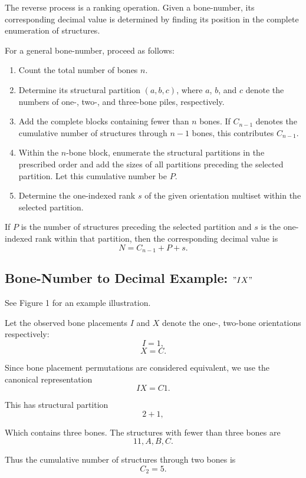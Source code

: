 \documentclass[11pt]{article}
\theoremstyle{remark}
\begin{document}
The reverse process is a ranking operation. Given a bone-number, its corresponding decimal value is determined by finding its position in the complete enumeration of structures.

\bigskip
For a general bone-number, proceed as follows:
\begin{enumerate}
	\item Count the total number of bones \(n\).
	\item Determine its structural partition \((a,b,c)\), where \(a\), \(b\),
	      and \(c\) denote the numbers of one-, two-, and three-bone piles,
	      respectively.
	\item Add the complete blocks containing fewer than \(n\) bones. If
	      \(C_{n-1}\) denotes the cumulative number of structures through
	      \(n-1\) bones, this contributes \(C_{n-1}\).
	\item Within the \(n\)-bone block, enumerate the structural partitions in
	      the prescribed order and add the sizes of all partitions preceding
	      the selected partition. Let this cumulative number be \(P\).
	\item Determine the one-indexed rank \(s\) of the given orientation
	      multiset within the selected partition.
\end{enumerate}

If \(P\) is the number of structures preceding the selected partition and
\(s\) is the one-indexed rank within that partition, then the corresponding
decimal value is
\[
\boxed{
N=C_{n-1}+P+s.
}
\]

\subsection{Bone-Number to Decimal Example: \("IX"\)}

See Figure 1 for an example illustration.

\bigskip
Let the observed bone placements \(I\) and \(X\) denote the one-, two-bone orientations respectively:
\[
I=1,
\]
\[
X=C.
\]

Since bone placement permutations are considered equivalent, we use the canonical representation
\[
IX=C1.
\]

This has structural partition
\[
2+1,
\]

Which contains three bones. The structures with fewer than three bones are
\[
11,A,B,C.
\]

Thus the cumulative number of structures through two bones is
\[
C_2=5.
\]
\end{document}
